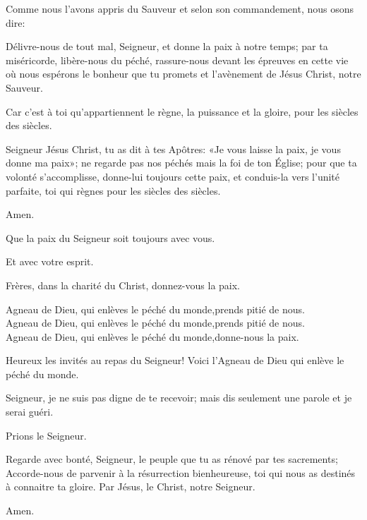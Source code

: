 \pr Comme nous l'avons appris du Sauveur et selon son commandement, nous osons dire:



\pr Délivre-nous de tout mal, Seigneur, et donne la paix à notre temps; par ta miséricorde, libère-nous du péché, rassure-nous devant les épreuves en cette vie où nous espérons le bonheur que tu promets et l’avènement de Jésus Christ, notre Sauveur.

\be Car c'est à toi qu'appartiennent le règne, la puissance et la gloire, pour les siècles des siècles.

\pr Seigneur Jésus Christ, tu as dit à tes Apôtres: «Je vous laisse la paix, je vous donne ma paix»; ne regarde pas nos péchés mais la foi de ton Église; pour que ta volonté s’accomplisse, donne-lui toujours cette paix, et conduis-la vers l'unité parfaite, toi qui règnes pour les siècles des siècles.

\be Amen.

\pr Que la paix du Seigneur soit toujours avec vous.

\be Et avec votre esprit.

\pr Frères, dans la charité du Christ, donnez-vous la paix.

\be Agneau de Dieu, qui enlèves le péché du monde,\redast prends pitié de nous.\\
\indent\be Agneau de Dieu, qui enlèves le péché du monde,\redast prends pitié de nous.\\
\indent\be Agneau de Dieu, qui enlèves le péché du monde,\redast donne-nous la paix.

\pr Heureux les invités au repas du Seigneur! Voici l'Agneau de Dieu qui enlève le péché du monde.

\be Seigneur, je ne suis pas digne de te recevoir; mais dis seulement une parole et je serai guéri.

\pr Prions le Seigneur.

\pr Regarde avec bonté, Seigneur, le peuple que tu as rénové par tes sacrements; Accorde-nous de parvenir à la résurrection bienheureuse, toi qui nous as destinés à connaitre ta gloire. Par Jésus, le Christ, notre Seigneur.

\be Amen.